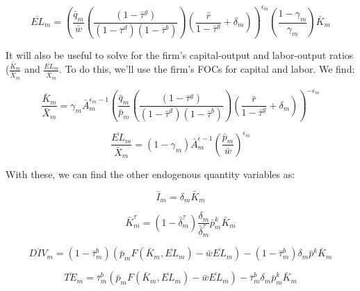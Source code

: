\documentclass[letterpaper,12pt]{article}
\theoremstyle{definition}
\begin{document}
\begin{spacing}{1.5}
\begin{equation}
\label{eqn:l_demand_tax_ss}
\overline{EL}_{m} = \left(\frac{\bar{q}_{m}}{\bar{w}}\left(\frac{(1-\bar{\tau}^{g})}{(1-\bar{\tau}^{d})(1-\bar{\tau}^{b})}\right)\left(\frac{\bar{r}}{1-\bar{\tau}^{g}}+\delta_{m}\right)\right)^{\epsilon_{m}}\left(\frac{1-\gamma_{m}}{\gamma_{m}}\right)\bar{K}_{m} 
\end{equation}



It will also be useful to solve for the firm's capital-output and labor-output ratios ($\frac{\bar{K}_{m}}{\bar{X}_{m}}$ and $\frac{\overline{EL}_{m}}{\bar{X}_{m}}$.  To do this, we'll use the firm's FOCs for capital and labor.  We find:

\begin{equation}
\label{eqn:k_over_x_tax_ss}
\frac{\bar{K}_{m}}{\bar{X}_{m}} = \gamma_{m}\bar{A}_{m}^{\epsilon_{m}-1} \left(\frac{\bar{q}_{m}}{\bar{p}_{m}}\left(\frac{(1-\bar{\tau}^{g})}{(1-\bar{\tau}^{d})(1-\bar{\tau}^{b})}\right)\left(\frac{\bar{r}}{1-\bar{\tau}^{g}}+\delta_{m}\right)\right)^{-\epsilon_{m}}
\end{equation}

\begin{equation}
\label{eqn:l_over_x_tax_ss}
\frac{\overline{EL}_{m}}{\bar{X}_{m}} = (1-\gamma_{m})\bar{A}_{m}^{\epsilon-1}\left(\frac{\bar{p}_{m}}{\bar{w}}\right)^{\epsilon_{m}}
\end{equation}

With these, we can find the other endogenous quantity variables as:

\begin{equation}
\bar{I}_{m} = \delta_{m}\bar{K}_{m} 
\end{equation}

\begin{equation}
\bar{K}^{\tau}_{m} = (1-\bar{\delta}^{\tau}_{m})\frac{\delta_{m}}{\bar{\delta}^{\tau}_{m}}\bar{p}^{k}_{m}\bar{K}_{m} 
\end{equation}

\begin{equation}
\overline{DIV}_{m} = (1-\bar{\tau}^{b}_{m})\left(\bar{p}_{m}F(\bar{K}_{m},\overline{EL}_{m}) - \bar{w}\overline{EL}_{m}\right) - (1-\bar{\tau}^{b}_{m})\delta_{m}\bar{p}^{k}\bar{K}_{m}
\end{equation}

\begin{equation}
\label{eqn:inc_tax_firm_ss}
\overline{TE}_{m} =\bar{\tau}^{b}_{m}\left(\bar{p}_{m}F(\bar{K}_{m},\overline{EL}_{m})-\bar{w}\overline{EL}_{m} \right) - \bar{\tau}^{b}_{m}\delta_{m}\bar{p}^{k}_{m}\bar{K}_{m} 
\end{equation}


\end{spacing}
\end{document}

